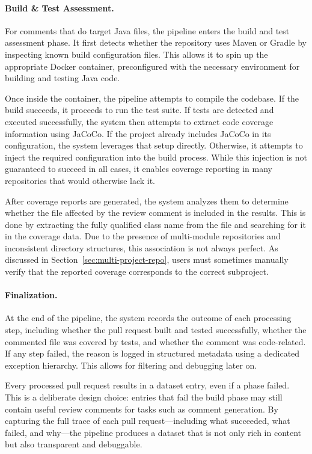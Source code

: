 \paragraph{Build \& Test Assessment.} For comments that do target Java files, the pipeline enters
the build and test assessment phase. It first detects whether the repository uses Maven or Gradle by
inspecting known build configuration files. This allows it to spin up the appropriate Docker
container, preconfigured with the necessary environment for building and testing Java code.

Once inside the container, the pipeline attempts to compile the codebase. If the build succeeds, it
proceeds to run the test suite. If tests are detected and executed successfully, the system then
attempts to extract code coverage information using JaCoCo. If the project already includes JaCoCo
in its configuration, the system leverages that setup directly. Otherwise, it attempts to inject the
required configuration into the build process. While this injection is not guaranteed to succeed in
all cases, it enables coverage reporting in many repositories that would otherwise lack it.

After coverage reports are generated, the system analyzes them to determine whether the file
affected by the review comment is included in the results. This is done by extracting the fully
qualified class name from the file and searching for it in the coverage data. Due to the presence of
multi-module repositories and inconsistent directory structures, this association is not always
perfect. As discussed in Section~\ref{sec:multi-project-repo}, users must sometimes manually verify
that the reported coverage corresponds to the correct subproject.

\paragraph{Finalization.} At the end of the pipeline, the system records the outcome of each
processing step, including whether the pull request built and tested successfully, whether the
commented file was covered by tests, and whether the comment was code-related. If any step failed,
the reason is logged in structured metadata using a dedicated exception hierarchy. This allows for
filtering and debugging later on.

Every processed pull request results in a dataset entry, even if a phase failed. This is a
deliberate design choice: entries that fail the build phase may still contain useful review comments
for tasks such as comment generation. By capturing the full trace of each pull request—including
what succeeded, what failed, and why—the pipeline produces a dataset that is not only rich in
content but also transparent and debuggable.

